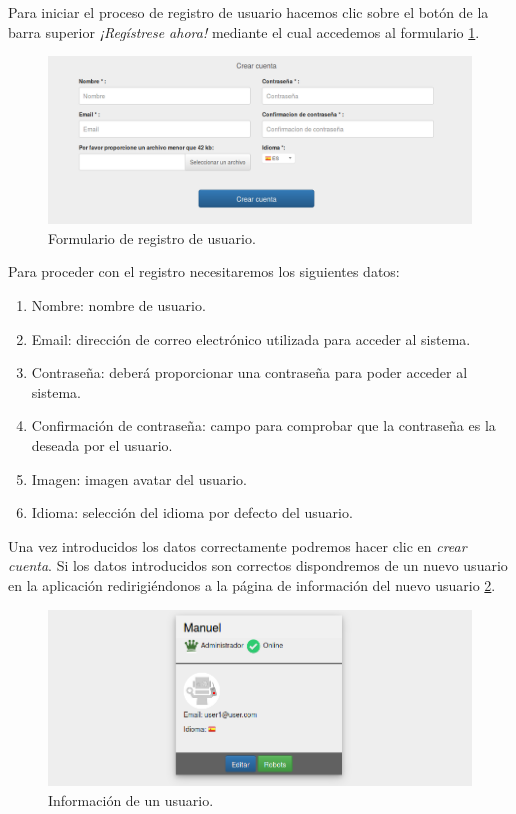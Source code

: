 Para iniciar el proceso de registro de usuario hacemos clic sobre el botón de la barra superior \emph{¡Regístrese ahora!} mediante el cual accedemos al formulario \ref{website:formulario-registro}.

\begin{figure}[H]
  \begin{center}
    \includegraphics[scale=0.4]{imagenes/manual-usuario/pagina-registro.png}
  \end{center}
  \caption{Formulario de registro de usuario.}
  \label{website:formulario-registro}
\end{figure}

Para proceder con el registro necesitaremos los siguientes datos:

\begin{enumerate}
 \item Nombre: nombre de usuario.
 \item Email: dirección de correo electrónico utilizada para acceder al sistema.
 \item Contraseña: deberá proporcionar una contraseña para poder acceder al sistema.
 \item Confirmación de contraseña: campo para comprobar que la contraseña es la deseada por el usuario.
 \item Imagen: imagen avatar del usuario.
 \item Idioma: selección del idioma por defecto del usuario.
\end{enumerate}

Una vez introducidos los datos correctamente podremos hacer clic en \emph{crear cuenta}. Si los datos introducidos son correctos dispondremos de un nuevo usuario en la aplicación redirigiéndonos
a la página de información del nuevo usuario \ref{website:informacion-usuario}.

\begin{figure}[H]
  \begin{center}
    \includegraphics[scale=0.4]{imagenes/manual-usuario/informacion-usuario.png}
  \end{center}
  \caption{Información de un usuario.}
  \label{website:informacion-usuario}
\end{figure}



